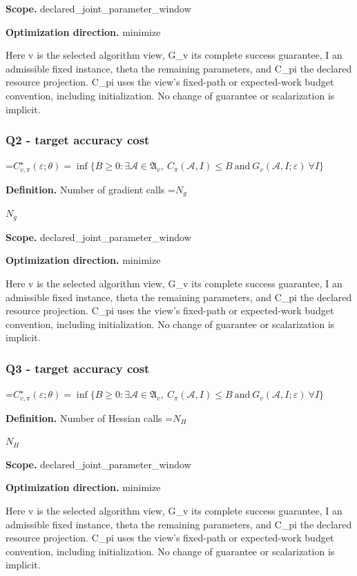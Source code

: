 \documentclass[10pt,a4paper]{article}
\newcommand{\AtlasMath}[1]{\par\begingroup\centering\setbox0=\hbox{$\displaystyle #1$}\ifdim\wd0>1.4\linewidth\typeout{ATLAS WIDE FORMULA: \the\wd0}\fi\ifdim\wd0>\linewidth\resizebox{\linewidth}{!}{\box0}\else\box0\fi\par\endgroup}
\newcommand{\AtlasInlineMath}[1]{\begingroup\setbox0=\hbox{$#1$}\ifdim\wd0>.4\linewidth\endgroup\AtlasMath{#1}\else\endgroup$#1$\fi}
\begin{document}
\textbf{Scope.} declared\_\allowbreak{}joint\_\allowbreak{}parameter\_\allowbreak{}window

\textbf{Optimization direction.} minimize

Here v is the selected algorithm view, G\_\allowbreak{}v its complete success guarantee, I an admissible fixed instance, theta the remaining parameters, and C\_\allowbreak{}pi the declared resource projection. C\_\allowbreak{}pi uses the view's fixed-path or expected-work budget convention, including initialization. No change of guarantee or scalarization is implicit.

\subsubsection{Q2 - target accuracy cost}
\AtlasMath{C^\star_{v,\pi}(\varepsilon;\theta)=\inf\{B\ge0:\exists\mathcal A\in\mathfrak A_v,\ C_\pi(\mathcal A,I)\le B\ \text{and}\ G_v(\mathcal A,I;\varepsilon)\ \forall I\}}
\textbf{Definition.} Number of gradient calls \AtlasInlineMath{N_g}

\textbf{Scope.} declared\_\allowbreak{}joint\_\allowbreak{}parameter\_\allowbreak{}window

\textbf{Optimization direction.} minimize

Here v is the selected algorithm view, G\_\allowbreak{}v its complete success guarantee, I an admissible fixed instance, theta the remaining parameters, and C\_\allowbreak{}pi the declared resource projection. C\_\allowbreak{}pi uses the view's fixed-path or expected-work budget convention, including initialization. No change of guarantee or scalarization is implicit.

\subsubsection{Q3 - target accuracy cost}
\AtlasMath{C^\star_{v,\pi}(\varepsilon;\theta)=\inf\{B\ge0:\exists\mathcal A\in\mathfrak A_v,\ C_\pi(\mathcal A,I)\le B\ \text{and}\ G_v(\mathcal A,I;\varepsilon)\ \forall I\}}
\textbf{Definition.} Number of Hessian calls \AtlasInlineMath{N_H}

\textbf{Scope.} declared\_\allowbreak{}joint\_\allowbreak{}parameter\_\allowbreak{}window

\textbf{Optimization direction.} minimize

Here v is the selected algorithm view, G\_\allowbreak{}v its complete success guarantee, I an admissible fixed instance, theta the remaining parameters, and C\_\allowbreak{}pi the declared resource projection. C\_\allowbreak{}pi uses the view's fixed-path or expected-work budget convention, including initialization. No change of guarantee or scalarization is implicit.
\end{document}
